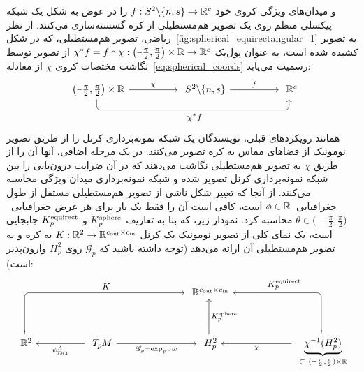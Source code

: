\citet{zhao2018distortion} و \citet{tateno2018distortion} میدان‌های ویژگی کروی خود $f: S^2 \backslash \{n,s\} \to \mathbb{R}^c$ را در عوض به شکل یک شبکه پیکسلی منظم روی یک تصویر هم‌مستطیلی از کره گسسته‌سازی می‌کنند.
از نظر ریاضی، تصویر هم‌مستطیلی، که در شکل~\ref{fig:spherical_equirectangular_1} به تصویر کشیده شده است، به عنوان پول‌بک
$\chi^*f = f \circ \chi: \big(\minus\frac{\pi}{2}, \frac{\pi}{2}\big) \times \R \to \R^c$
از تصویر توسط نگاشت مختصات کروی $\chi$ از معادله~\eqref{eq:spherical_coords} رسمیت می‌یابد:
\begin{equation}\label{cd:equirectangular_proj}
\begin{tikzcd}[column sep=50pt, row sep=25pt, font=\normalsize]
    {\big(\minus\frac{\pi}{2}, \frac{\pi}{2}\big)} \times \R
        \arrow[r, "\chi"]
        \arrow[rr, pos=.5, rounded corners, to path={ 
            -- ([yshift=-2.5ex]\tikztostart.south) 
            --node[below]{\small$
                \chi^*f
                $} ([yshift=-2.5ex]\tikztotarget.south) 
            -- (\tikztotarget.south)
            }]
    & S^2 \backslash \{n,s\}
        \arrow[r, "f"]
    & \R^c \mkern-12mu\phantom{\big)}
\end{tikzcd}
\end{equation}
همانند رویکردهای قبلی، نویسندگان یک شبکه نمونه‌برداری کرنل را از طریق تصویر نومونیک از فضاهای مماس به کره تصویر می‌کنند.
در یک مرحله اضافی، آنها آن را از طریق $\chi$ به تصویر هم‌مستطیلی نگاشت می‌دهند که در آن ضرایب درون‌یابی را بین شبکه نمونه‌برداری کرنل تصویر شده و شبکه نمونه‌برداری میدان ویژگی محاسبه می‌کنند.
از آنجا که تغییر شکل ناشی از تصویر هم‌مستطیلی مستقل از طول جغرافیایی~$\phi \in \mathbb{R}$ است، کافی است آن را فقط یک بار برای هر عرض جغرافیایی~$\theta \in {\textstyle \big(\minus\frac{\pi}{2}, \frac{\pi}{2}\big)}$ محاسبه کرد.
نمودار زیر، که بنا به تعاریف $K^{\textup{sphere}}_p$ و $K^{\textup{equirect}}_p$ جابجایی است، یک نمای کلی از تصویر نومونیک یک کرنل $K: \mathbb{R}^2 \to \mathbb{R}^{{c_\textup{out}}\times{c_\textup{in}}}$ به کره \cite{coors2018spherenet,eder2019convolutions,martin2020panoramic} و به تصویر هم‌مستطیلی آن \cite{zhao2018distortion,tateno2018distortion} ارائه می‌دهد (توجه داشته باشید که $\mathscr{G}_p$ روی $H_p^2$ وارون‌پذیر است):
\begin{equation}
\begin{tikzcd}[column sep=50pt, row sep=36pt, font=\normalsize]
    & &[20pt]
    \R^{\cout\times\cin}
    \\
    \R^2
        \arrow[urr, pos=.75, rounded corners, to path={ 
            -- ([yshift=0pt]\tikztostart.north) 
            |-node[above]{\small$
                 K
                $} ([xshift=0ex]\tikztotarget.west) 
            }]
    & \TpM
        \arrow[l, "\psiTMp^A"]
        \arrow[r, "\mathscr{G}_p = \exp_p\mkern-2mu\circ\mkern2mu\omega"']
    & H_p^2
        \arrow[u, "K_p^\textup{sphere}\,"']
    &[10pt] \underbrace{\chi^{-1}(H_p^2)}_{\subset\ (\protect\minus\frac{\pi}{2}, \frac{\pi}{2}) \times \R}
        \arrow[l, "\chi"]
        \arrow[ul, pos=.72, rounded corners, to path={ 
            -- ([yshift=0pt]\tikztostart.north) 
            |-node[above]{\small$
                 K^{\textup{equirect}}_p
                $} ([xshift=0ex]\tikztotarget.east) 
            }]
\end{tikzcd}
\end{equation}
